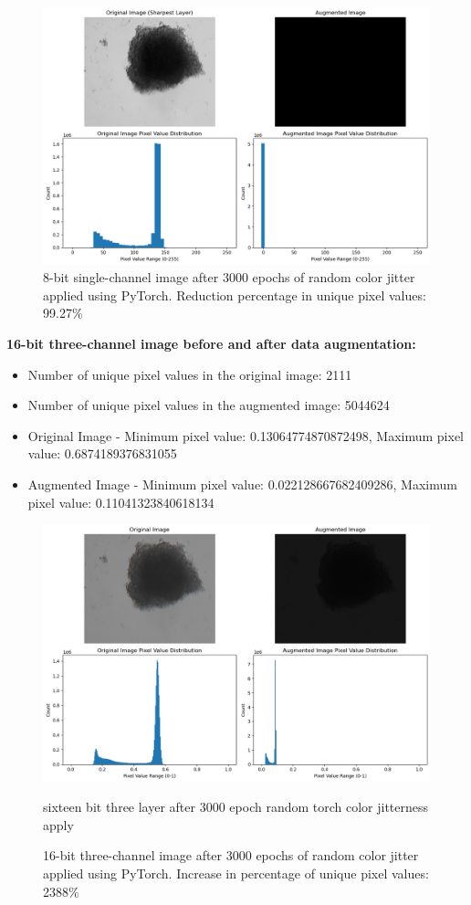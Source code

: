 \begin{figure}[H]
  \centering
  \includegraphics[scale=0.5]{figures/8bit_nOne.png} 
  \caption{8-bit single-channel image after 3000 epochs of random color jitter applied using PyTorch. Reduction percentage in unique pixel values: 99.27\%}
  \label{fig:8bit_n one}
\end{figure}

\textbf{16-bit three-channel image before and after data augmentation:}
\begin{itemize}
  \item Number of unique pixel values in the original image: 2111
  \item Number of unique pixel values in the augmented image: 5044624
  \item Original Image - Minimum pixel value: 0.13064774870872498, Maximum pixel value: 0.6874189376831055
  \item Augmented Image - Minimum pixel value: 0.022128667682409286, Maximum pixel value: 0.11041323840618134
\end{itemize}

\begin{figure}[H]
  \centering
  \includegraphics[scale=0.5]{figures/16bit_three_1.png} 
  \caption{sixteen bit three layer after 3000 epoch random torch color jitterness apply}
  \caption{16-bit three-channel image after 3000 epochs of random color jitter applied using PyTorch. Increase in percentage of unique pixel values: 2388\%}
  \label{fig:16bit_three_version1}
\end{figure}

